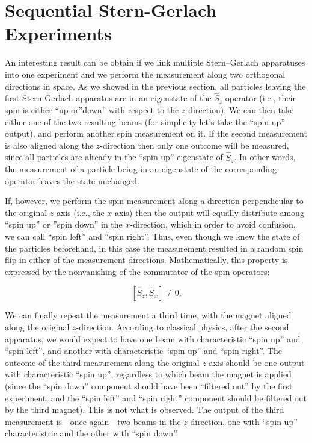\documentclass[
  9pt,
]{extbook}
\theoremstyle{definition}
\theoremstyle{definition}
\theoremstyle{definition}
\theoremstyle{remark}
\begin{document}
\hypertarget{sequential-stern-gerlach-experiments}{%
\section{Sequential Stern-Gerlach Experiments}\label{sequential-stern-gerlach-experiments}}

An interesting result can be obtain if we link multiple Stern--Gerlach apparatuses into one experiment and we perform the measurement along two orthogonal directions in space.
As we showed in the previous section, all particles leaving the first Stern-Gerlach apparatus are in an eigenstate of the \(\hat{S}_z\) operator (i.e., their spin is either ``up or''down'' with respect to the \(z\)-direction). We can then take either one of the two resulting beams (for simplicity let's take the ``spin up'' output), and perform another spin measurement on it. If the second measurement is also aligned along the \(z\)-direction then only one outcome will be measured, since all particles are already in the ``spin up'' eigenstate of \(\hat{S}_z\). In other words, the measurement of a particle being in an eigenstate of the corresponding operator leaves the state unchanged.

If, however, we perform the spin measurement along a direction perpendicular to the original \(z\)-axis (i.e., the \(x\)-axis) then the output will equally distribute among ``spin up'' or ''spin down'' in the \(x\)-direction, which in order to avoid confusion, we can call ``spin left'' and ``spin right''. Thus, even though we knew the state of the particles beforehand, in this case the measurement resulted in a random spin flip in either of the measurement directions. Mathematically, this property is expressed by the nonvanishing of the commutator of the spin operators:

\begin{equation}
\left[\hat{S}_z,\hat{S}_x \right] \neq 0.
\label{eq:spin4}    
\end{equation}

We can finally repeat the measurement a third time, with the magnet aligned along the original \(z\)-direction. According to classical physics, after the second apparatus, we would expect to have one beam with characteristic ``spin up'' and ``spin left'', and another with characteristic ``spin up'' and ``spin right''. The outcome of the third measurement along the original \(z\)-axis should be one output with characteristic ``spin up'', regardless to which beam the magnet is applied (since the ``spin down'' component should have been ``filtered out'' by the first experiment, and the ``spin left'' and ``spin right'' component should be filtered out by the third magnet). This is not what is observed. The output of the third measurement is---once again---two beams in the \(z\) direction, one with ``spin up'' characteristric and the other with ``spin down''.
\end{document}
